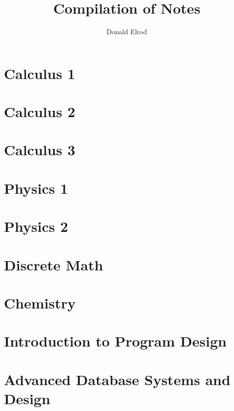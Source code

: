 \documentclass[12pt, letterpaper]{memoir}
\title{Compilation of Notes}
\author{Donald Elrod}
\begin{document}
\maketitle

\clearpage
	
\tableofcontents

\clearpage


\part{Calculus 1}


\part{Calculus 2}


\part{Calculus 3}


\part{Physics 1}


\part{Physics 2}


\part{Discrete Math}


\part{Chemistry}







\part{Introduction to Program Design}

\part{Advanced Database Systems and Design}
\end{document}
